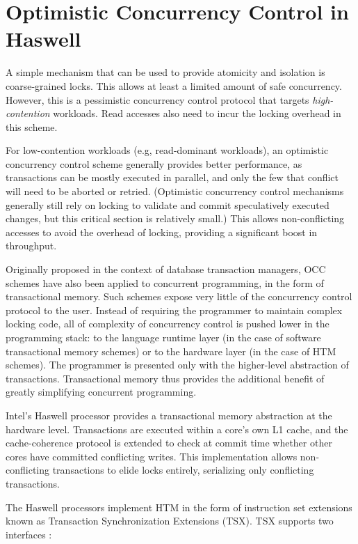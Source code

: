 \section{Optimistic Concurrency Control in Haswell} \label{sec:tm}

A simple mechanism that can be used to provide atomicity and isolation is
coarse-grained locks. This allows at least a limited amount of safe concurrency.
However, this is a pessimistic concurrency control protocol that targets
\textit{high-contention} workloads. Read accesses also need to incur the locking overhead
in this scheme.

For low-contention workloads (e.g, read-dominant workloads), an optimistic
concurrency control scheme generally provides better performance, as
transactions can be mostly executed in parallel, and only the few that conflict
will need to be aborted or retried. (Optimistic concurrency control mechanisms
generally still rely on locking to validate and commit speculatively executed
changes, but this critical section is relatively small.) This allows
non-conflicting accesses to avoid the overhead of locking, providing a
significant boost in throughput.

Originally proposed in the context of database transaction managers, OCC schemes
have also been applied to concurrent programming, in the form of transactional
memory. Such schemes expose very little of the concurrency control protocol to
the user. Instead of requiring the programmer to maintain complex locking code,
all of complexity of concurrency control is pushed lower in the programming
stack: to the language runtime layer (in the case of software transactional
memory schemes) or to the hardware layer (in the case of HTM schemes). The
programmer is presented only with the higher-level abstraction of
transactions. Transactional memory thus provides the additional benefit of
greatly simplifying concurrent programming.

Intel's Haswell processor provides a transactional memory abstraction at the
hardware level. Transactions are executed within a core's own L1 cache, and the
cache-coherence protocol is extended to check at commit time whether other cores
have committed conflicting writes. This implementation allows non-conflicting
transactions to elide locks entirely, serializing only conflicting transactions.

The Haswell processors implement HTM in the form of instruction set extensions
known as Transaction Synchronization Extensions (TSX). TSX supports two
interfaces \citep{tsx-intro}: \\

